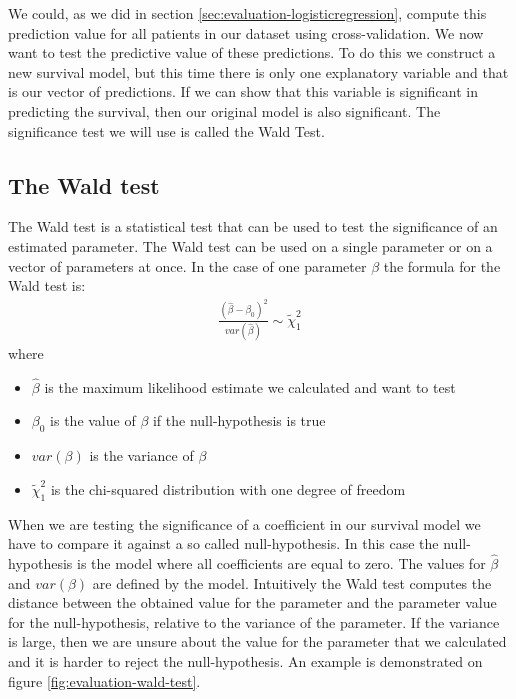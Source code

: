  We could, as we did in section \ref{sec:evaluation-logisticregression}, compute this prediction value for all patients in our dataset using cross-validation. We now want to test the predictive value of these predictions. To do this we construct a new survival model, but this time there is only one explanatory variable and that is our vector of predictions. If we can show that this variable is significant in predicting the survival, then our original model is also significant. The significance test we will use is called the Wald Test.
 
 \subsection{The Wald test}
The Wald test\cite{wikiwald} is a statistical test that can be used to test the significance of an estimated parameter. The Wald test can be used on a single parameter or on a vector of parameters at once. In the case of one parameter $\beta$ the formula for the Wald test is:
\begin{equation}
\begin{split}
\frac{(\hat{\beta}-\beta_{0})^{2}}{var(\hat{\beta})} \sim \tilde{\chi}^{2}_{1}
\end{split}
\end{equation}
where
\begin{itemize}
	\item $\hat{\beta}$ is the maximum likelihood estimate we calculated and want to test
	\item $\beta_{0}$ is the value of $\beta$ if the null-hypothesis is true
	\item $var(\beta)$ is the variance of $\beta$
	\item $\tilde{\chi}^{2}_{1}$ is the chi-squared distribution with one degree of freedom
\end{itemize}
When we are testing the significance of a coefficient in our survival model we have to compare it against a so called null-hypothesis. In this case the null-hypothesis is the model where all coefficients are equal to zero. The values for $\hat{\beta}$ and $var(\beta)$ are defined by the model. Intuitively the Wald test computes the distance between the obtained value for the parameter and the parameter value for the null-hypothesis, relative to the variance of the parameter. If the variance is large, then we are unsure about the value for the parameter that we calculated and it is harder to reject the null-hypothesis. An example is demonstrated on figure \ref{fig:evaluation-wald-test}. \\ \\

